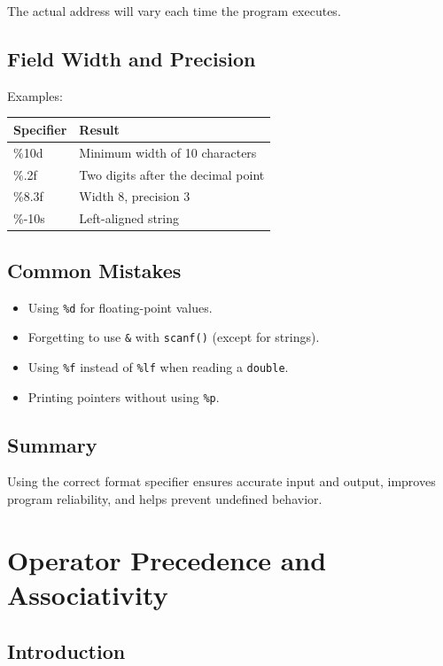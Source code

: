 \documentclass[12pt,openany]{book}
\begin{document}
The actual address will vary each time the program executes.

\section{Field Width and Precision}

Examples:

\begin{center}
\begin{tabular}{|l|l|}
\hline
Specifier & Result \\
\hline
\%10d & Minimum width of 10 characters \\
\%.2f & Two digits after the decimal point \\
\%8.3f & Width 8, precision 3 \\
\%-10s & Left-aligned string \\
\hline
\end{tabular}
\end{center}

\section{Common Mistakes}

\begin{itemize}
    \item Using \texttt{\%d} for floating-point values.
    \item Forgetting to use \texttt{\&} with \texttt{scanf()} (except for strings).
    \item Using \texttt{\%f} instead of \texttt{\%lf} when reading a \texttt{double}.
    \item Printing pointers without using \texttt{\%p}.
\end{itemize}

\section{Summary}

Using the correct format specifier ensures accurate input and output, improves program reliability, and helps prevent undefined behavior.
\chapter{Operator Precedence and Associativity}

\section{Introduction}
\end{document}
